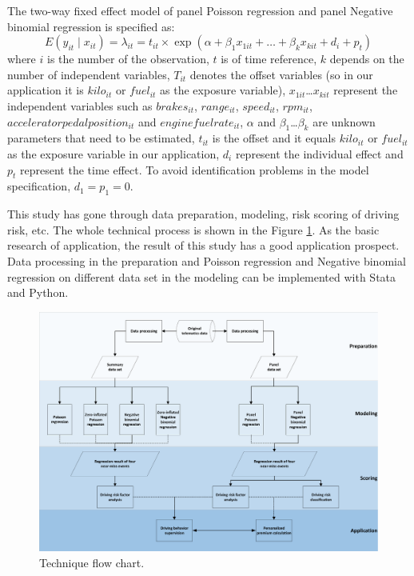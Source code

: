 \documentclass[num-refs]{wiley-article}
\begin{document}
The two-way fixed effect model of panel Poisson regression and panel Negative binomial regression is specified as:
\begin{equation}
E(y_{it}\mid x_{it} ) =\lambda _{it}= t_{it} \times \exp (\alpha +\beta_{1}x_{1it} +\dots +\beta_{k}x_{kit}+d_{i}+p_{t})
\end{equation}
where $i$ is the number of the observation, $t$ is of time reference, $k$ depends on the number of independent variables, $T_{it}$ denotes the offset variables (so in our application it is $kilo_{it}$ or $fuel_{it}$ as the exposure variable), $x_{1it}$\dots $x_{kit}$ represent the independent variables such as $brakes_{it}$, $range_{it}$, $speed_{it}$, $rpm_{it}$, $acceleratorpedalposition_{it}$ and $enginefuelrate_{it}$, $\alpha$ and $\beta _{1}$\dots $\beta _{k}$ are unknown parameters that need to be estimated, $t_{it}$ is the offset and it equals $kilo_{it}$ or $fuel_{it}$ as the exposure variable in our application, $d_i$ represent the individual effect and $p_t$ represent the time effect. To avoid identification problems in the model specification, $d_1=p_1=0$.

This study has gone through data preparation, modeling, risk scoring of driving risk, etc. The whole technical process is shown in the Figure \ref{flow}. As the basic research of application, the result of this study has a good application prospect. Data processing in the preparation and Poisson regression and Negative binomial regression on different data set in the modeling can be implemented with Stata and Python.

\begin{figure}[htbp]
\centering
\includegraphics[width=1\textwidth]{Figure/Flow chat.pdf}
\caption{Technique flow chart.}
\label{flow}
\end{figure}
\end{document}
